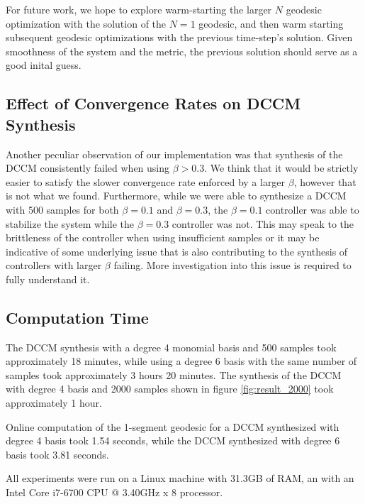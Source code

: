 \documentclass[journal]{IEEEtran}
\begin{document}
For future work, we hope to explore warm-starting the larger $N$ geodesic optimization with the solution of the $N=1$ geodesic, and then warm starting subsequent geodesic optimizations with the previous time-step's solution. Given smoothness of the system and the metric, the previous solution should serve as a good inital guess.

\subsection{Effect of Convergence Rates on DCCM Synthesis}
Another peculiar observation of our implementation was that synthesis of the DCCM consistently failed when using $\beta > 0.3$. We think that it would be strictly easier to satisfy the slower convergence rate enforced by a larger $\beta$, however that is not what we found. Furthermore, while we were able to synthesize a DCCM with 500 samples for both $\beta = 0.1$ and $\beta = 0.3$, the $\beta = 0.1$ controller was able to stabilize the system while the $\beta = 0.3$ controller was not. This may speak to the brittleness of the controller when using insufficient samples or it may be indicative of some underlying issue that is also contributing to the synthesis of controllers with larger $\beta$ failing. More investigation into this issue is required to fully understand it.

\subsection{Computation Time}
The DCCM synthesis with a degree 4 monomial basis and 500 samples took approximately 18 minutes, while using a degree 6 basis with the same number of samples took approximately 3 hours 20 minutes. The synthesis of the DCCM with degree 4 basis and 2000 samples shown in figure \ref{fig:result_2000} took approximately 1 hour.

Online computation of the 1-segment geodesic for a DCCM synthesized with degree 4 basis took 1.54 seconds, while the DCCM synthesized with degree 6 basis took 3.81 seconds.

All experiments were run on a Linux machine with 31.3GB of RAM, an with an Intel Core i7-6700 CPU @ 3.40GHz x 8 processor.
\end{document}

